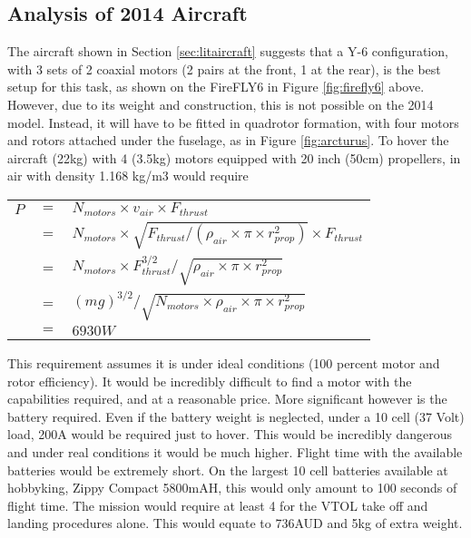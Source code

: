 \label{sec:AppA}
\subsection{Analysis of 2014 Aircraft}
\label{sec:lastYear}
The aircraft shown in Section \ref{sec:litaircraft} suggests that a Y-6 configuration, with 3 sets of 2 coaxial motors (2 pairs at the front, 1 at the rear), is the best setup for this task, as shown on the FireFLY6 in Figure \ref{fig:firefly6} above. However, due to its weight and construction, this is not possible on the 2014 model. Instead, it will have to be fitted in quadrotor formation, with four motors and rotors attached under the fuselage, as in Figure \ref{fig:arcturus}. To hover the aircraft (22kg) with 4 (3.5kg) motors equipped with 20 inch (50cm) propellers, in air with density 1.168 kg/m3 would require\\

\begin{tabular}{r c l}
	$P$ & $=$ & $N_{motors} \times v_{air} \times F_{thrust}$\\
	& $=$ & $N_{motors} \times \sqrt{F_{thrust}/(\rho_{air} \times \pi \times r_{prop}^2)} \times F_{thrust}$\\
	& $=$ & $N_{motors} \times F_{thrust}^{3/2}/\sqrt{\rho_{air} \times \pi \times r_{prop}^2}$\\
	& $=$ & $(mg)^{3/2}/\sqrt{N_{motors} \times \rho_{air} \times \pi \times r_{prop}^2}$\\
	& $=$ & $6930W$\\
\end{tabular}
\vspace{6pt}
	
This requirement assumes it is under ideal conditions (100 percent motor and rotor efficiency). It would be incredibly difficult to find a motor with the capabilities required, and at a reasonable price. More significant however is the battery required. Even if the battery weight is neglected, under a 10 cell (37 Volt) load, 200A would be required just to hover. This would be incredibly dangerous and under real conditions it would be much higher. Flight time with the available batteries would be extremely short. On the largest 10 cell batteries available at hobbyking, Zippy Compact 5800mAH, this would only amount to 100 seconds of flight time. The mission would require at least 4 for the VTOL take off and landing procedures alone. This would equate to 736AUD and 5kg of extra weight.\\

